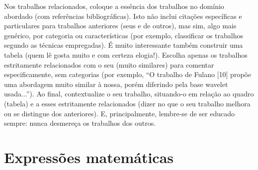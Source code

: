 
\label{Cap:TrabalhosRelacionados}

Nos trabalhos relacionados, coloque a essência dos trabalhos no domínio abordado (com referências bibliográficas). Isto não inclui citações específicas e particulares para trabalhos anteriores (seus e de outros), mas sim, algo mais genérico, por categoria ou características (por exemplo, classificar os trabalhos segundo as técnicas empregadas). É muito interessante também construir uma tabela (quem lê gosta muito e com certeza elogia!). Escolha apenas os trabalhos estritamente relacionados com o seu (muito similares) para comentar especificamente, sem categorias (por exemplo, ``O trabalho de Fulano [10] propõe uma abordagem muito similar à nossa, porém diferindo pela base wavelet usada...''). Ao final, contextualize o seu trabalho, situando-o em relação ao quadro (tabela) e a esses estritamente relacionados (dizer no que o seu trabalho melhora ou se distingue dos anteriores). E, principalmente, lembre-se de ser educado sempre: nunca desmereça os trabalhos dos outros.


\section{Expressões matemáticas}
\label{Sec:expressoesMatematicas}


